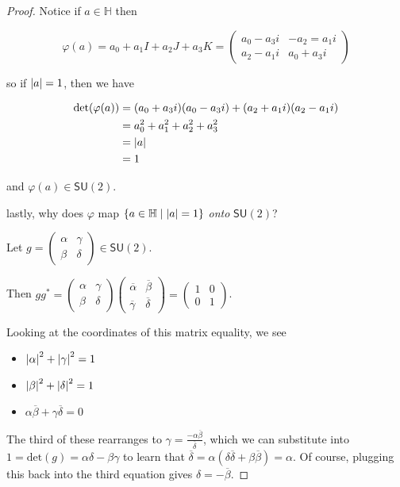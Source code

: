 \documentclass[../main.tex]{subfiles}
\begin{document}
\begin{proof}
  Notice if $a \in \mathbb{H}$ then

  \[
    \varphi(a) 
    = a_0 + a_1 I + a_2 J + a_3 K 
    = \begin{pmatrix} a_0 - a_3 i & -a_2 = a_1 i \\ a_2 - a_1 i & a_0 + a_3 i \end{pmatrix}
  \]

  so if $\left \lvert a \right \rvert = 1$, then we have

  \begin{align*}
    \text{det}(\varphi(a)) 
    &= (a_0 + a_3 i)(a_0 - a_3 i) + (a_2 + a_1 i)(a_2 - a_1 i) \\
    &= a_0^2 + a_1^2 + a_2^2 + a_3^2 \\
    &= \left \lvert a \right \rvert \\
    &= 1
  \end{align*}

  and $\varphi(a) \in \mathsf{SU}(2)$.

  lastly, why does $\varphi$ map $\{ a \in \mathbb{H} \mid \left \lvert a \right \rvert = 1 \}$
  \emph{onto} $\mathsf{SU}(2)$?

  Let $g = \begin{pmatrix} \alpha & \gamma \\ \beta & \delta \end{pmatrix} \in \mathsf{SU}(2)$.

  Then $g g^* = 
  \begin{pmatrix} \alpha & \gamma \\ \beta & \delta \end{pmatrix} 
  \begin{pmatrix} \overline{\alpha} & \overline{\beta} \\ \overline{\gamma} & \overline{\delta} \end{pmatrix} = 
  \begin{pmatrix} 1 & 0 \\ 0 & 1 \end{pmatrix}$.

  Looking at the coordinates of this matrix equality, we see

  \begin{itemize}
    \item $\left \lvert \alpha \right \rvert^2 + \left \lvert \gamma \right \rvert^2 = 1$
    \item $\left \lvert \beta \right \rvert^2 + \left \lvert \delta \right \rvert^2 = 1$
    \item $\alpha \overline{\beta} + \gamma \overline{\delta} = 0$
  \end{itemize}

  The third of these rearranges to $\gamma = \frac{- \alpha \overline{\beta}}{\overline{\delta}}$,
  which we can substitute into $1 = \text{det}(g) = \alpha \delta - \beta \gamma$ 
  to learn that $\overline{\delta} = \alpha (\delta \overline{\delta} + \beta \overline{\beta}) = \alpha$.
  Of course, plugging this back into the third equation gives $\delta = - \overline{\beta}$.


\end{proof}
\end{document}
